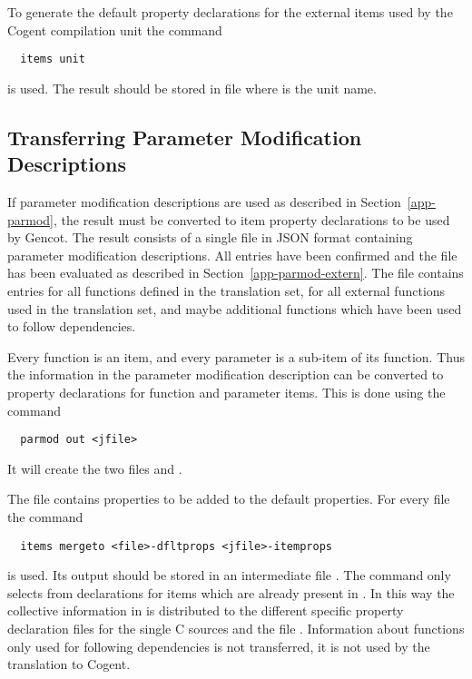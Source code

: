 To generate the default property declarations for the external items used by the Cogent compilation unit the command
\begin{verbatim}
  items unit
\end{verbatim}
is used. The result should be stored in file  where  is the unit name. 

\subsection{Transferring Parameter Modification Descriptions}
\label{app-itemprops-parmod}

If parameter modification descriptions are used as described in Section~\ref{app-parmod}, the result must be converted to item
property declarations to be used by Gencot. The result consists of a single file  in JSON format containing 
parameter modification descriptions. All entries have been confirmed and the file has been evaluated as described in 
Section~\ref{app-parmod-extern}. The file contains entries for all functions defined in the translation set, for all external 
functions used in the translation set, and maybe additional functions which have been used to follow dependencies.

Every function is an item, and every parameter is a sub-item of its function. Thus the information in the parameter modification
description can be converted to property declarations for function and parameter items. This is done using the command
\begin{verbatim}
  parmod out <jfile>
\end{verbatim}
It will create the two files  and . 

The file  contains properties to be added to the default properties. For every file 
the command 
\begin{verbatim}
  items mergeto <file>-dfltprops <jfile>-itemprops
\end{verbatim}
is used. Its output should be stored in an intermediate file . The command only selects from 
 declarations for items which are already present in
. In this way the collective information in  is distributed to the different
specific property declaration files for the single C sources and the file . Information about functions
only used for following dependencies is not transferred, it is not used by the translation to Cogent.

